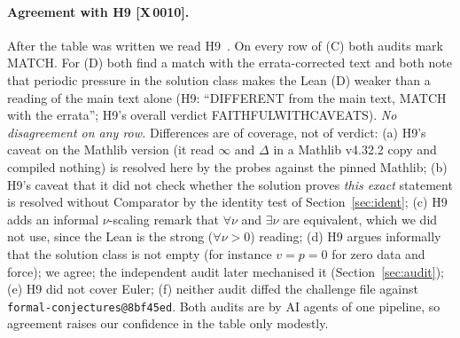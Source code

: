 \documentclass[10pt]{article}
\newcommand{\tg}[2]{\texorpdfstring{\textsf{[#1\,#2]}}{}}  %
\renewcommand{\_}{\textunderscore\allowbreak}
\begin{document}
\paragraph{Agreement with H9 \tg{X}{0010}.} After the table was written we read H9~\cite{h9}. On every row of (C) both audits mark MATCH. For (D) both find a match with the errata-corrected text and both note that periodic pressure in the solution class makes the Lean (D) weaker than a reading of the main text alone (H9: ``DIFFERENT from the main text, MATCH with the errata''; H9's overall verdict
\textsc{FAITHFUL\_WITH\_CAVEATS}). \emph{No disagreement on any row.} Differences are of coverage, not of verdict:
(a) H9's caveat on the Mathlib version (it read $\infty$ and $\Delta$ in a Mathlib v4.32.2 copy and compiled nothing) is resolved here by the probes against the pinned Mathlib; (b) H9's caveat that it did not check whether the solution proves \emph{this exact} statement is resolved without Comparator by the identity test of Section~\ref{sec:ident}; (c) H9 adds an informal $\nu$-scaling remark that $\forall\nu$ and $\exists\nu$ are equivalent,
which we did not use, since the Lean is the strong ($\forall\nu>0$) reading; (d) H9 argues informally that the solution class is not empty (for instance $v=p=0$ for zero data and force); we agree; the independent audit later mechanised it (Section~\ref{sec:audit}); (e) H9 did not cover Euler; (f) neither audit diffed the challenge file against \texttt{formal-conjectures@8bf45ed}.
Both audits are by AI agents of one pipeline, so agreement raises our confidence in the table only modestly.
\end{document}
